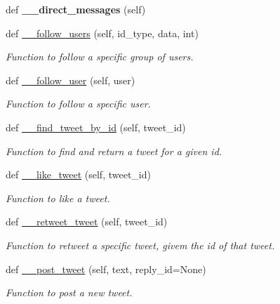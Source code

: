 \begin{DoxyCompactItemize}
\mbox{\label{classtwitter_1_1bots_1_1twitter__bot_1_1TwitterBot_a28c7dc9fb3ddd4c1b02b8b483006d268}} 
def {\bfseries \+\_\+\+\_\+direct\+\_\+messages} (self)
\item 
def \hyperlink{classtwitter_1_1bots_1_1twitter__bot_1_1TwitterBot_a41eeff7626d4c7a2e1fa982ffeb58294}{\+\_\+\+\_\+follow\+\_\+users} (self, id\+\_\+type, data, int)
\begin{DoxyCompactList}\small\item\em Function to follow a specific group of users. \end{DoxyCompactList}\item 
def \hyperlink{classtwitter_1_1bots_1_1twitter__bot_1_1TwitterBot_ae019ecb5a4b7bfb6252be161c2099a4d}{\+\_\+\+\_\+follow\+\_\+user} (self, user)
\begin{DoxyCompactList}\small\item\em Function to follow a specific user. \end{DoxyCompactList}\item 
def \hyperlink{classtwitter_1_1bots_1_1twitter__bot_1_1TwitterBot_ab6f4609e94426bd00037ac0570d26860}{\+\_\+\+\_\+find\+\_\+tweet\+\_\+by\+\_\+id} (self, tweet\+\_\+id)
\begin{DoxyCompactList}\small\item\em Function to find and return a tweet for a given id. \end{DoxyCompactList}\item 
def \hyperlink{classtwitter_1_1bots_1_1twitter__bot_1_1TwitterBot_a27184061e80795ada1340fc80f630b64}{\+\_\+\+\_\+like\+\_\+tweet} (self, tweet\+\_\+id)
\begin{DoxyCompactList}\small\item\em Function to like a tweet. \end{DoxyCompactList}\item 
def \hyperlink{classtwitter_1_1bots_1_1twitter__bot_1_1TwitterBot_a4a2081f8a1447b3d2fbb1cbdfbc7d4ab}{\+\_\+\+\_\+retweet\+\_\+tweet} (self, tweet\+\_\+id)
\begin{DoxyCompactList}\small\item\em Function to retweet a specific tweet, givem the id of that tweet. \end{DoxyCompactList}\item 
def \hyperlink{classtwitter_1_1bots_1_1twitter__bot_1_1TwitterBot_aa25c1ceb5f93e186cd5cbce3a3afae59}{\+\_\+\+\_\+post\+\_\+tweet} (self, text, reply\+\_\+id=None)
\begin{DoxyCompactList}\small\item\em Function to post a new tweet. \end{DoxyCompactList}\end{DoxyCompactItemize}
